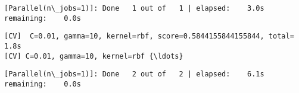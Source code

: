 \documentclass[11pt]{article}
\begin{document}
    \begin{Verbatim}[commandchars=\\\{\}]
[Parallel(n\_jobs=1)]: Done   1 out of   1 | elapsed:    3.0s remaining:    0.0s

    \end{Verbatim}

    \begin{Verbatim}[commandchars=\\\{\}]
[CV]  C=0.01, gamma=10, kernel=rbf, score=0.5844155844155844, total=   1.8s
[CV] C=0.01, gamma=10, kernel=rbf {\ldots}

    \end{Verbatim}

    \begin{Verbatim}[commandchars=\\\{\}]
[Parallel(n\_jobs=1)]: Done   2 out of   2 | elapsed:    6.1s remaining:    0.0s

    \end{Verbatim}
\end{document}
